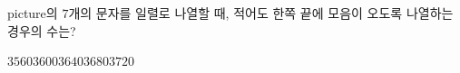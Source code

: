 picture의 $7$개의 문자를 일렬로 나열할 때, 적어도 한쪽 끝에 모음이 오도록 나열하는 경우의 수는?
\begin{choices32}{$3560$}{$3600$}{$3640$}{$3680$}{$3720$}\end{choices32}
